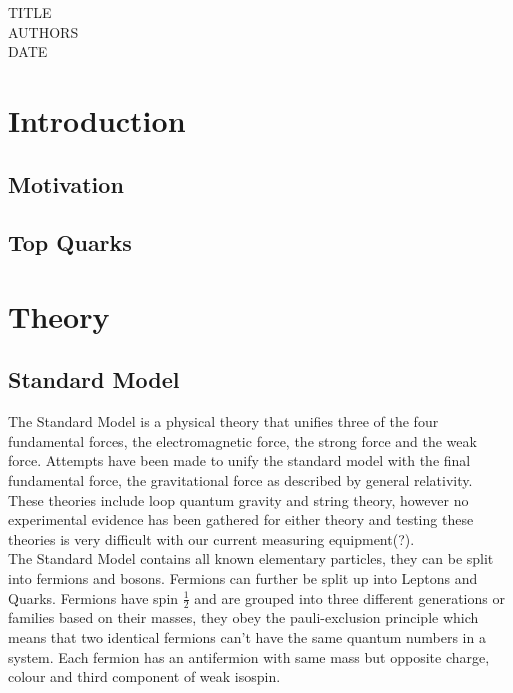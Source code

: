 \documentclass[11pt,a4paper]{article}
\begin{document}
TITLE\\
AUTHORS\\
DATE

\cleardoublepage{}
\begin{abstract}
  
\end{abstract}
\cleardoublepage{}
\tableofcontents{}
\section{Introduction}

\subsection{Motivation}

\subsection{Top Quarks}

\section{Theory}

\subsection{Standard Model}
The Standard Model is a physical theory that unifies
three of the four fundamental forces, the electromagnetic force, the strong
force and the weak force. Attempts have been made to unify the standard model
with the final fundamental force, the gravitational force as described by
general relativity. These theories include loop quantum gravity and string
theory, however no experimental evidence has been gathered for either theory and
testing these theories is very difficult with our current measuring
equipment(?).\\

The Standard Model contains all known elementary particles, they can be split
into fermions and bosons. Fermions can further be split up into Leptons and
Quarks. Fermions have spin $\frac{1}{2}$ and are grouped into three different
generations or families based on their masses, they obey the pauli-exclusion
principle which means that two identical fermions can't have the same quantum
numbers in a system. Each fermion has an antifermion with same mass but opposite
charge, colour and third component of weak isospin. \\
\end{document}

